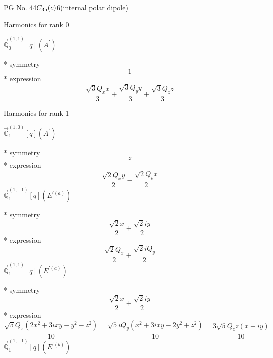 \documentclass[fleqn,8pt]{jsarticle}
\begin{document}
\setcounter{MaxMatrixCols}{32}

\renewcommand{\tablename}{Table~}
\renewcommand{\figurename}{Figure~}
\begin{center}
\LARGE
PG No. 44\quad$C_{\rm 3h}(c)$\quad$\bar{6}$\quad[ hexagonal ] (internal polar dipole)
\end{center}

\noindent * Harmonics for rank 0

\noindent\quad $\vec{\mathbb{Q}}_{0}^{(1,1)}[q](A^{\prime})$

\noindent\quad ** symmetry
\begin{dmath*}
1
\end{dmath*}
\noindent\quad ** expression
\begin{dmath*}
\frac{\sqrt{3} Q_{x} x}{3} + \frac{\sqrt{3} Q_{y} y}{3} + \frac{\sqrt{3} Q_{z} z}{3}
\end{dmath*}

\noindent * Harmonics for rank 1

\noindent\quad $\vec{\mathbb{G}}_{1}^{(1,0)}[q](A^{\prime})$

\noindent\quad ** symmetry
\begin{dmath*}
z
\end{dmath*}
\noindent\quad ** expression
\begin{dmath*}
\frac{\sqrt{2} Q_{x} y}{2} - \frac{\sqrt{2} Q_{y} x}{2}
\end{dmath*}
\noindent\quad $\vec{\mathbb{Q}}_{1}^{(1,-1)}[q](E^{\prime(a)})$

\noindent\quad ** symmetry
\begin{dmath*}
\frac{\sqrt{2} x}{2} + \frac{\sqrt{2} i y}{2}
\end{dmath*}
\noindent\quad ** expression
\begin{dmath*}
\frac{\sqrt{2} Q_{x}}{2} + \frac{\sqrt{2} i Q_{y}}{2}
\end{dmath*}
\noindent\quad $\vec{\mathbb{Q}}_{1}^{(1,1)}[q](E^{\prime(a)})$

\noindent\quad ** symmetry
\begin{dmath*}
\frac{\sqrt{2} x}{2} + \frac{\sqrt{2} i y}{2}
\end{dmath*}
\noindent\quad ** expression
\begin{dmath*}
\frac{\sqrt{5} Q_{x} \left(2 x^{2} + 3 i x y - y^{2} - z^{2}\right)}{10} - \frac{\sqrt{5} i Q_{y} \left(x^{2} + 3 i x y - 2 y^{2} + z^{2}\right)}{10} + \frac{3 \sqrt{5} Q_{z} z \left(x + i y\right)}{10}
\end{dmath*}
\noindent\quad $\vec{\mathbb{Q}}_{1}^{(1,-1)}[q](E^{\prime(b)})$
\end{document}
